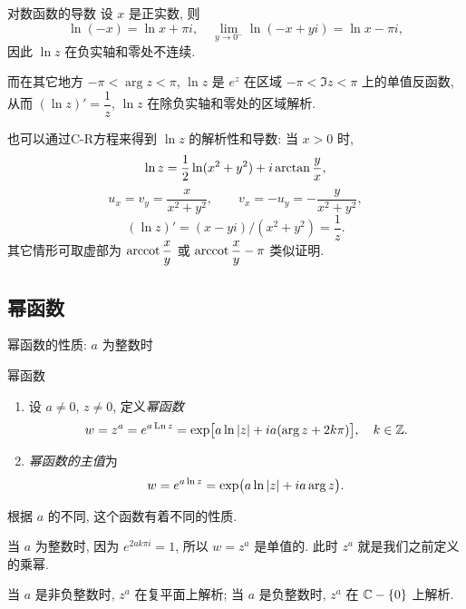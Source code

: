 \begin{frame}{对数函数的导数}
\beqskip{1pt}
	\onslide<+->
	设 $x$ 是正实数, 
	\onslide<+->
	则
	\[\ln (-x)=\ln x+\pi i,\quad
	\lim_{y\to0^-}\ln (-x+yi)=\ln x-\pi i,\]
	\onslide<+->
	因此 $\ln z$ 在负实轴和零处不连续.

	\onslide<+->
	而在其它地方 $-\pi<\arg z<\pi$, $\ln z$ 是 $e^z$ 在区域 $-\pi<\Im z<\pi$ 上的单值反函数, 
	\onslide<+->
	从而
	\alert{$(\ln z)'=\dfrac 1z$},
	\alert{$\ln z$ 在除负实轴和零处的区域解析}.

	\onslide<+->
	也可以通过C-R方程来得到 $\ln z$ 的解析性和导数: 当 $x>0$ 时,
	\[\ln z=\frac{1}{2} \ln(x^2+y^2)+i\arctan \frac yx,\]
	\onslide<+->
	\[u_x=v_y=\frac x{x^2+y^2},\qquad v_x=-u_y=-\frac y{x^2+y^2},\]
	\[(\ln z)'=(x-yi)/(x^2+y^2)=\frac 1z.\]
	其它情形可取虚部为 $\operatorname{arccot}\dfrac xy$ 或 $\operatorname{arccot}\dfrac xy-\pi$ 类似证明.
\endgroup
\end{frame}


\subsection{幂函数}

\begin{frame}{幂函数的性质: $a$ 为整数时}
	\onslide<+->
	\begin{third}{幂函数}
		\begin{enumerate}
			\item 设 $a\neq 0$, $z\neq 0$, 定义\emph{幂函数}
			\[w=z^a=e^{a\operatorname{Ln} z}
			=\exp\bigl[a\ln\left|z\right|+ia(\arg z+2k\pi)\bigr],\quad k\in{\mathbb{Z}}.\]
			\item \emph{幂函数的主值}为
			\[w=e^{a\ln z}=\exp\bigl(a\ln\left|z\right|+ia\arg z\bigr).\]
		\end{enumerate}
		\vspace{-\baselineskip}
	\end{third}
	\onslide<+->
	根据 $a$ 的不同, 这个函数有着不同的性质.

	\onslide<+->
	当 $a$ 为整数时, 因为 $e^{2ak\pi i}=1$, 所以 $w=z^a$ 是单值的.
	\onslide<+->
	此时 $z^a$ 就是我们之前定义的乘幂.

	\onslide<+->
	当 $a$ 是非负整数时, $z^a$ 在复平面上解析;
	\onslide<+->
	当 $a$ 是负整数时, $z^a$ 在 ${\mathbb{C}}-{\left\{0\right\}}$ 上解析.
\end{frame}


